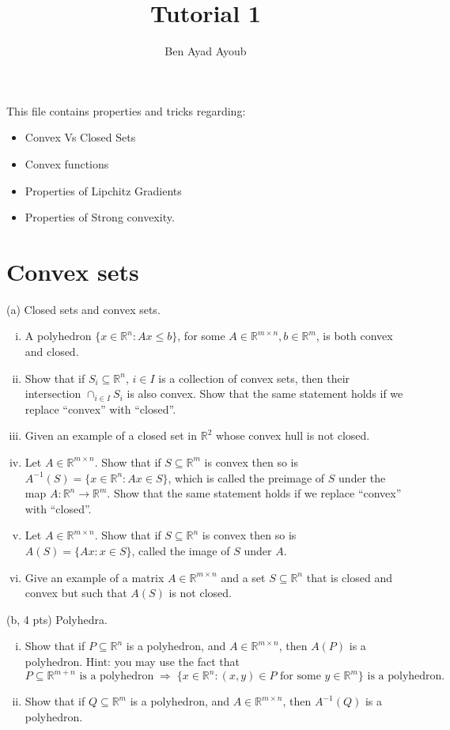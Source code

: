 \documentclass{article}
\theoremstyle{remark}
\theoremstyle{definition}
\def\R{\mathbb{R}}
\begin{document}
\title{Tutorial 1}
\author{\Large Ben Ayad Ayoub}

\bigskip


\maketitle

\noindent
This file contains properties and tricks regarding:
\begin{itemize}
    \item Convex Vs Closed Sets
    \item Convex functions
    \item Properties of Lipchitz Gradients
    \item Properties of Strong convexity.
\end{itemize}

\section{Convex sets}

\noindent
(a) Closed sets and convex sets. 
\begin{enumerate}[i.]
\item A polyhedron $\{x \in \R^n : Ax \leq b \}$, for some $A\in
  \R^{m\times  n},  b\in \R^m$, is both convex and closed.  
\item  Show that if $S_i \subseteq \R^n$, $i\in I$ is a collection of convex 
  sets, then their intersection $\cap_{i\in I} S_i$ is also convex.  Show that
  the same statement holds if we replace ``convex'' with ``closed''.  
\item Given an example of a closed set in $\R^2$ whose convex hull is not
  closed.  
\item Let $A\in\R^{m\times n}$. Show that if $S\subseteq \R^m$ is convex then
  so is $A^{-1}(S) =\{ x \in \R^n : Ax \in S\}$, which is called the preimage of
  $S$ under the map $A :\R^n  \to \R^m$. Show that the same statement holds if
  we replace  ``convex'' with ``closed''.   
\item Let $A\in\R^{m\times n}$.  Show that if $S\subseteq \R^n$ is convex then 
  so is $A(S) = \{ Ax : x \in S \}$, called the image of $S$ under $A$. 
\item  Give an example of a matrix $A\in\R^{m\times n}$ and a set $S\subseteq
  \R^n$ that is closed and convex but such that $A(S)$ is not closed.  
\end{enumerate}

\bigskip
\noindent
(b, 4 pts) Polyhedra.
\begin{enumerate}[i.]
\item Show that if $P \subseteq \R^n$ is a polyhedron, and $A \in \R^{m \times
    n}$, then $A(P)$ is a polyhedron. Hint: you may use the fact that 
  $$
  \text{$P \subseteq \R^{m+n}$ is a polyhedron} 
  \; \Rightarrow \;
  \text{$\{x\in \R^n : \text{$(x,y)\in P$ for some $y\in\R^m$}\}$ 
    is a polyhedron}.
  $$
\item Show that if $Q \subseteq \R^m$ is a polyhedron, and $A \in \R^{m \times
    n}$, then $A^{-1}(Q)$ is a polyhedron. 
\end{enumerate}
\end{document}
